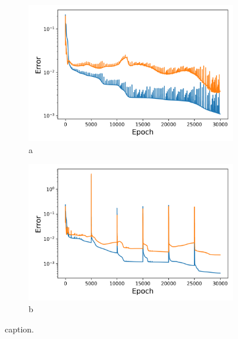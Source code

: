\begin{figure}[htbp]
	\centering
	\begin{subfigure}{.45\textwidth}
		\centering
		\includegraphics[width=1\linewidth]{./figs/sm_rep_loss_plot.png}  
		\caption{a}
	\end{subfigure}
	\begin{subfigure}{.45\textwidth}
		\centering
		\includegraphics[width=1\linewidth]{./figs/snap_rep_loss_plot.png}  
		\caption{b}
	\end{subfigure}
	\caption{caption.}
\end{figure}
